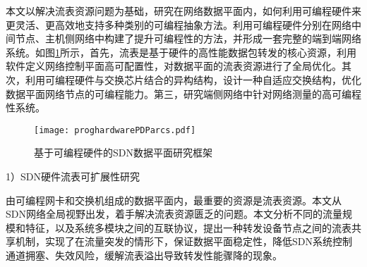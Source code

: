 \label{chap12}

本文以解决流表资源问题为基础，研究在网络数据平面内，如何利用可编程硬件来更灵活、更高效地支持多种类别的可编程抽象方法。利用可编程硬件分别在网络中间节点、主机侧网络中构建了提升可编程性的方法，并形成一套完整的端到端网络系统。如图\ref{fig:proghardwarePDParcs}所示，首先，流表是基于硬件的高性能数据包转发的核心资源，利用软件定义网络控制平面高可配置性，对数据平面的流表资源进行了全局优化。其次，利用可编程硬件与交换芯片结合的异构结构，设计一种自适应交换结构，优化数据平面网络节点的可编程能力。第三，研究端侧网络中针对网络测量的高可编程性系统。
%
%
%


\begin{figure}[!ht]
	\centering
	\texttt{[image: proghardwarePDParcs.pdf]}
	\caption{基于可编程硬件的SDN数据平面研究框架} \label{fig:proghardwarePDParcs}
\end{figure}


1）SDN硬件流表可扩展性研究

由可编程网卡和交换机组成的数据平面内，最重要的资源是流表资源。本文从SDN网络全局视野出发，着手解决流表资源匮乏的问题。本文分析不同的流量规模和特征，以及系统多模块之间的互联协议，提出一种转发设备节点之间的流表共享机制，实现了在流量突发的情形下，保证数据平面稳定性，降低SDN系统控制通道拥塞、失效风险，缓解流表溢出导致转发性能骤降的现象。




